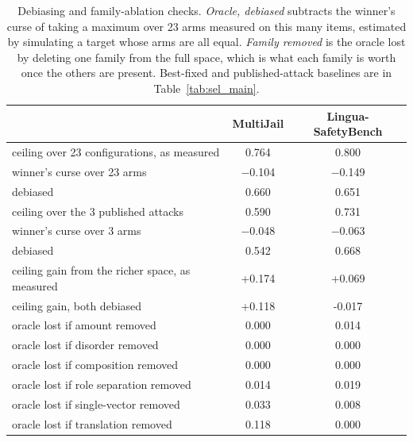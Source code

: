 \begin{table}[t]
\centering
\small
\caption{Debiasing and family-ablation checks. \emph{Oracle, debiased} subtracts the winner's curse of taking a maximum over 23 arms measured on this many items, estimated by simulating a target whose arms are all equal. \emph{Family removed} is the oracle lost by deleting one family from the full space, which is what each family is worth once the others are present. Best-fixed and published-attack baselines are in Table~\ref{tab:sel_main}.}
\label{tab:sel_robust}
\begin{tabular}{lcc}
\toprule
& MultiJail & Lingua-SafetyBench \\
\midrule
ceiling over 23 configurations, as measured & 0.764 & 0.800 \\
\quad winner's curse over 23 arms & $-$0.104 & $-$0.149 \\
\quad debiased & 0.660 & 0.651 \\
ceiling over the 3 published attacks & 0.590 & 0.731 \\
\quad winner's curse over 3 arms & $-$0.048 & $-$0.063 \\
\quad debiased & 0.542 & 0.668 \\
\midrule
ceiling gain from the richer space, as measured & +0.174 & +0.069 \\
ceiling gain, both debiased & +0.118 & -0.017 \\
\midrule
oracle lost if amount removed & 0.000 & 0.014 \\
oracle lost if disorder removed & 0.000 & 0.000 \\
oracle lost if composition removed & 0.000 & 0.000 \\
oracle lost if role separation removed & 0.014 & 0.019 \\
oracle lost if single-vector removed & 0.033 & 0.008 \\
oracle lost if translation removed & 0.118 & 0.000 \\
\bottomrule
\end{tabular}
\end{table}
